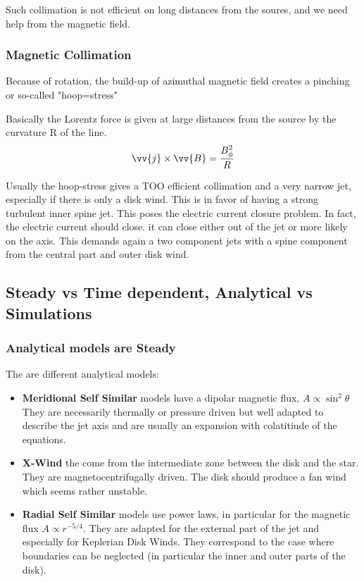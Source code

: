 \documentclass[10pt,a4paper,english,draft]{article}
\begin{document}

Such collimation is not efficient on long distances from the soures, and we need help from the magnetic field.

\subsubsection{Magnetic Collimation}
Because of rotation, the build-up of azimuthal magnetic field creates a pinching or so-called "hoop=stress"


Basically the Lorentz force is given at large distances from the source by the curvature R of the line.
\begin{equation}
\vv{j} \times \vv{B} = \frac{B^2_{\phi}}{R}
\end{equation}

Usually the hoop-stress gives a TOO efficient collimation and a very narrow jet, especially if there is only a disk wind.
This is in favor of having a strong turbulent inner spine jet. This poses the electric current closure problem. In fact,
the electric current should close. it can close either out of the jet or more likely  on the axis. This demands again a
two component jets with a spine component  from the central part and outer disk wind.
\subsection{Steady vs Time dependent, Analytical vs Simulations}

\subsubsection{Analytical models are Steady}
The are different analytical models:
\begin{itemize}
\item \textbf{Meridional Self Similar} models have a dipolar magnetic flux, $A \propto \sin^2\theta$ They are necessarily thermally or pressure driven but well adapted to describe the jet axis and are usually an expansion with colatitiude of the equations.
\item \textbf{X-Wind} the come from the intermediate zone between the disk and the star. They are magnetocentrifugally driven. The disk should produce a fan wind which seems rather unstable.
 \item \textbf{Radial Self Similar} models use power laws, in particular for the magnetic flux $A \propto r^{-5/4}$. They are adapted for the external part of the jet and especially for Keplerian Disk Winds. They correspond to the case where boundaries can be neglected (in particular the inner and outer parts of the disk).

\end{itemize}
\end{document}
